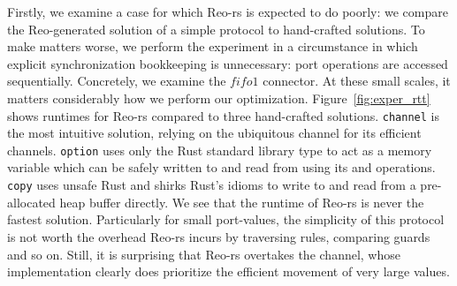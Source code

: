 Firstly, we examine a case for which Reo-rs is expected to do poorly: we compare the Reo-generated solution of a simple protocol to hand-crafted solutions. To make matters worse, we perform the experiment in a circumstance in which explicit synchronization bookkeeping is unnecessary: port operations are accessed sequentially.
Concretely, we examine the $fifo1$ connector. At these small scales, it matters considerably how we perform our optimization. Figure~\ref{fig:exper_rtt} shows runtimes for Reo-rs compared to three hand-crafted solutions. \texttt{channel} is the most intuitive solution, relying on the ubiquitous  channel for its efficient channels. \texttt{option} uses only the Rust standard library type  to act as a memory variable which can be safely written to and read from using its  and  operations. \texttt{copy} uses unsafe Rust and shirks Rust's idioms to write to and read from a pre-allocated heap buffer directly. We see that the runtime of Reo-rs is never the fastest solution. Particularly for small port-values, the simplicity of this protocol is not worth the overhead Reo-rs incurs by traversing rules, comparing guards and so on. Still, it is surprising that Reo-rs overtakes the  channel, whose implementation clearly does prioritize the efficient movement of very large values.

